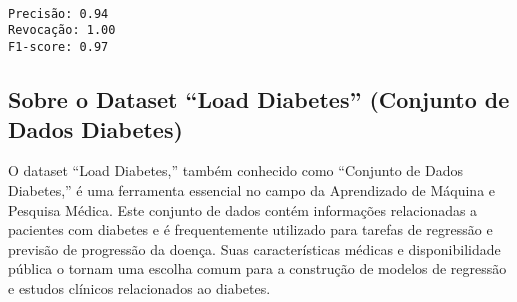 \documentclass[11pt]{article}
\begin{document}
    \begin{center}
    \end{center}
    { \hspace*{\fill} \\}
    
    \begin{center}
    \end{center}
    { \hspace*{\fill} \\}
    
    \begin{center}
    \end{center}
    { \hspace*{\fill} \\}
    
    \begin{Verbatim}[commandchars=\\\{\}]
Precisão: 0.94
Revocação: 1.00
F1-score: 0.97
    \end{Verbatim}

    \hypertarget{sobre-o-dataset-load-diabetes-conjunto-de-dados-diabetes}{%
\subsection{Sobre o Dataset ``Load Diabetes'' (Conjunto de Dados
Diabetes)}\label{sobre-o-dataset-load-diabetes-conjunto-de-dados-diabetes}}

O dataset ``Load Diabetes,'' também conhecido como ``Conjunto de Dados
Diabetes,'' é uma ferramenta essencial no campo da Aprendizado de
Máquina e Pesquisa Médica. Este conjunto de dados contém informações
relacionadas a pacientes com diabetes e é frequentemente utilizado para
tarefas de regressão e previsão de progressão da doença. Suas
características médicas e disponibilidade pública o tornam uma escolha
comum para a construção de modelos de regressão e estudos clínicos
relacionados ao diabetes.
\end{document}
